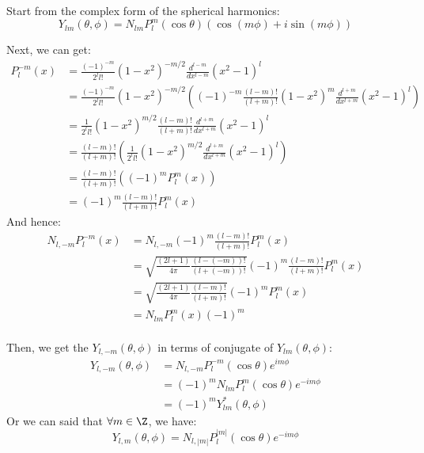 \bigskip \noindent
\begin{foundation}
    Start from the complex form of the spherical harmonics:
    \[
        Y_{lm}(\theta, \phi) = N_{lm} P_l^m(\cos \theta) \left( \cos(m \phi) + i \sin(m \phi) \right)
    \]

    Next, we can get:
    \begin{align*}
        P^{-m}_l(x) &= \frac{(-1)^{-m}}{2^l l!} (1 - x^2)^{-m/2} \frac{d^{l-m}}{dx^{l-m}} (x^2 - 1)^l \\
        &= \frac{(-1)^{-m}}{2^l l!} (1 - x^2)^{-m/2}  \left( (-1)^{-m} \frac{(l-m)!}{(l+m)!} (1-x^2)^m \frac{d^{l+m}}{dx^{l+m}} (x^2 - 1)^l \right) \\
        &= \frac{1}{2^l l!} (1 - x^2)^{m/2} \frac{(l-m)!}{(l+m)!} \frac{d^{l+m}}{dx^{l+m}} (x^2 - 1)^l \\
        &= \frac{(l-m)!}{(l+m)!} \left( \frac{1}{2^l l!} (1 - x^2)^{m/2} \frac{d^{l+m}}{dx^{l+m}} (x^2 - 1)^l \right) \\
        &= \frac{(l-m)!}{(l+m)!} \left( (-1)^m P_l^m(x) \right) \\
        &= (-1)^m \frac{(l-m)!}{(l+m)!} P_l^m(x)
    \end{align*}
    And hence:
    \begin{align*}
       N_{l,-m} P_l^{-m}(x) &= N_{l,-m} (-1)^m \frac{(l-m)!}{(l+m)!} P_l^m(x) \\
         &= \sqrt{\frac{(2l + 1)}{4\pi} \frac{(l - (-m))!}{(l + (-m))!}} (-1)^m \frac{(l-m)!}{(l+m)!} P_l^m(x) \\
         &= \sqrt{\frac{(2l + 1)}{4\pi} \frac{(l - m)!}{(l + m)!}} (-1)^m P_l^m(x) \\
         &= N_{lm} P_l^m(x) (-1)^m
    \end{align*} \\

    Then, we get the $ Y_{l,-m}(\theta, \phi)$ in terms of conjugate of $Y_{lm}(\theta, \phi)$:
    \begin{align*}
        Y_{l,-m}(\theta, \phi) &= N_{l,-m} P_l^{-m}(\cos \theta) e^{i m \phi} \\
        &= (-1)^m N_{lm} P_l^m(\cos \theta) e^{-i m \phi} \\
        &= (-1)^m Y_{lm}^*(\theta, \phi)
    \end{align*}
    Or we can said that $\forall m \in \Z$, we have:
    \[
        Y_{l,m}(\theta, \phi) = N_{l,|m|} P_l^{|m|}(\cos \theta) e^{-i m \phi}
    \] \\


\end{foundation}
